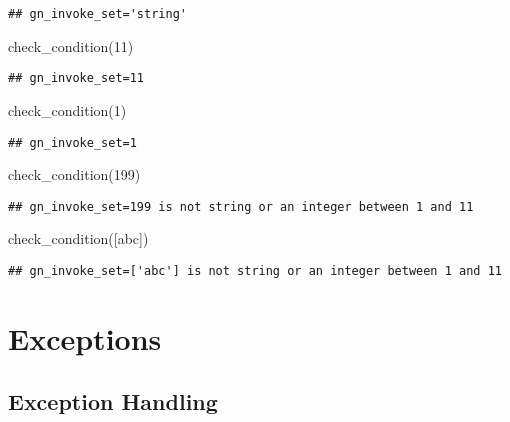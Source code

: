 \documentclass[
]{book}
\newenvironment{Shaded}{\begin{snugshade}}{\end{snugshade}}
\newcommand{\DecValTok}[1]{\textcolor[rgb]{0.00,0.00,0.81}{#1}}
\newcommand{\NormalTok}[1]{#1}
\newcommand{\StringTok}[1]{\textcolor[rgb]{0.31,0.60,0.02}{#1}}
\begin{document}
\begin{verbatim}
## gn_invoke_set='string'
\end{verbatim}

\begin{Shaded}
\begin{Highlighting}[]
\NormalTok{check\_condition(}\DecValTok{11}\NormalTok{)}
\end{Highlighting}
\end{Shaded}

\begin{verbatim}
## gn_invoke_set=11
\end{verbatim}

\begin{Shaded}
\begin{Highlighting}[]
\NormalTok{check\_condition(}\DecValTok{1}\NormalTok{)}
\end{Highlighting}
\end{Shaded}

\begin{verbatim}
## gn_invoke_set=1
\end{verbatim}

\begin{Shaded}
\begin{Highlighting}[]
\NormalTok{check\_condition(}\DecValTok{199}\NormalTok{)}
\end{Highlighting}
\end{Shaded}

\begin{verbatim}
## gn_invoke_set=199 is not string or an integer between 1 and 11
\end{verbatim}

\begin{Shaded}
\begin{Highlighting}[]
\NormalTok{check\_condition([}\StringTok{\textquotesingle{}abc\textquotesingle{}}\NormalTok{])}
\end{Highlighting}
\end{Shaded}

\begin{verbatim}
## gn_invoke_set=['abc'] is not string or an integer between 1 and 11
\end{verbatim}

\hypertarget{exceptions}{%
\section{Exceptions}\label{exceptions}}

\hypertarget{exception-handling}{%
\subsection{Exception Handling}\label{exception-handling}}
\end{document}
